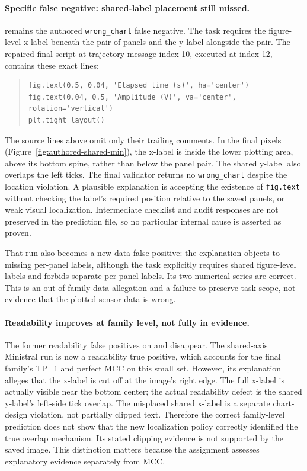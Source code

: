 \documentclass[11pt]{article}
\begin{document}
\paragraph{Specific false negative: shared-label placement still missed.}
 remains the authored
\texttt{wrong\_chart} false negative. The task requires the figure-level
x-label beneath the pair of panels and the y-label alongside the pair.
The repaired final script at trajectory message index 10, executed at
index 12, contains these exact lines:
\begin{quote}
\small
\begin{verbatim}
fig.text(0.5, 0.04, 'Elapsed time (s)', ha='center')
fig.text(0.04, 0.5, 'Amplitude (V)', va='center', rotation='vertical')
plt.tight_layout()
\end{verbatim}
\end{quote}
The source lines above omit only their trailing comments.
In the final pixels (Figure~\ref{fig:authored-shared-min}), the x-label
is inside the lower plotting area, above its bottom spine, rather than
below the panel pair. The shared y-label also overlaps the left ticks.
The final validator returns no \texttt{wrong\_chart} despite the location
violation. A plausible explanation is accepting the existence of
\texttt{fig.text} without checking the label's required position relative
to the saved panels, or weak visual localization. Intermediate checklist
and audit responses are not preserved in the prediction file, so no
particular internal cause is asserted as proven.

That run also becomes a new data false positive: the explanation objects
to missing per-panel labels, although the task explicitly requires
shared figure-level labels and forbids separate per-panel labels.
Its two numerical series are correct. This is an out-of-family
data allegation and a failure to preserve task scope, not evidence
that the plotted sensor data is wrong.

\paragraph{Readability improves at family level, not fully in evidence.}
The former readability false positives on
 and
 disappear.
The shared-axis Ministral run is now a readability true positive, which
accounts for the final family's TP=1 and perfect MCC on this small set.
However, its explanation alleges that the x-label is cut off at the
image's right edge. The full x-label is actually visible near the bottom
center; the actual readability defect is the shared y-label's left-side
tick overlap. The misplaced shared x-label is a separate chart-design
violation, not partially clipped text. Therefore the correct family-level
prediction does not show that the new localization policy correctly
identified the true overlap mechanism. Its stated clipping evidence
is not supported by the saved image. This distinction matters because
the assignment assesses explanatory evidence separately from MCC.
\end{document}
